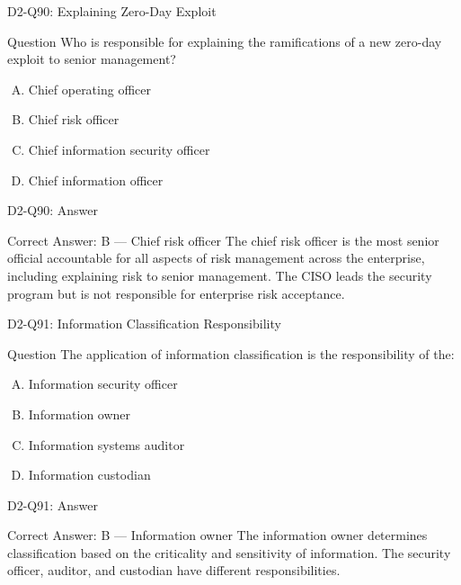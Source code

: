 \documentclass{beamer}
\begin{document}
	\begin{frame}{D2-Q90: Explaining Zero-Day Exploit}
		\begin{block}{Question}
			Who is responsible for explaining the ramifications of a new zero-day exploit to senior management?
		\end{block}
		\begin{enumerate}[(A)]
			\item Chief operating officer
			\item Chief risk officer
			\item Chief information security officer
			\item Chief information officer
		\end{enumerate}
	\end{frame}
	\begin{frame}{D2-Q90: Answer}
		\begin{block}{Correct Answer: B --- Chief risk officer}
			The chief risk officer is the most senior official accountable for all aspects of risk management across the enterprise, including explaining risk to senior management. The CISO leads the security program but is not responsible for enterprise risk acceptance.
		\end{block}
	\end{frame}
	
	\begin{frame}{D2-Q91: Information Classification Responsibility}
		\begin{block}{Question}
			The application of information classification is the responsibility of the:
		\end{block}
		\begin{enumerate}[(A)]
			\item Information security officer
			\item Information owner
			\item Information systems auditor
			\item Information custodian
		\end{enumerate}
	\end{frame}
	\begin{frame}{D2-Q91: Answer}
		\begin{block}{Correct Answer: B --- Information owner}
			The information owner determines classification based on the criticality and sensitivity of information. The security officer, auditor, and custodian have different responsibilities.
		\end{block}
	\end{frame}
	
\end{document}
